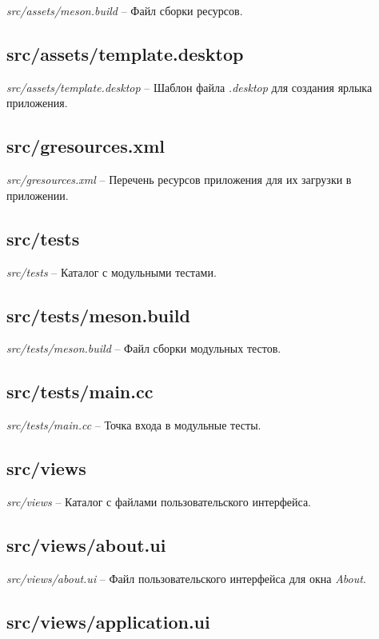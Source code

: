 \textit{src/assets/meson.build} -- Файл сборки ресурсов.

\subsection{src/assets/template.desktop}

\textit{src/assets/template.desktop} -- Шаблон файла \textit{.desktop} для
создания ярлыка приложения.

\subsection{src/gresources.xml}

\textit{src/gresources.xml} -- Перечень ресурсов приложения для их загрузки в
приложении.

\subsection{src/tests}

\textit{src/tests} -- Каталог с модульными тестами.

\subsection{src/tests/meson.build}

\textit{src/tests/meson.build} -- Файл сборки модульных тестов.

\subsection{src/tests/main.cc}

\textit{src/tests/main.cc} -- Точка входа в модульные тесты.

\subsection{src/views}

\textit{src/views} -- Каталог с файлами пользовательского интерфейса.

\subsection{src/views/about.ui}

\textit{src/views/about.ui} -- Файл пользовательского интерфейса для окна
\textit{About}.

\subsection{src/views/application.ui}

